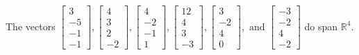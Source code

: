 \begin{exercise}
\begin{exerciseStatement}
  \end{exerciseStatement}
  \begin{exerciseAnswer}
   The vectors \(\left[\begin{array}{r}
3 \\
-5 \\
-1 \\
-1
\end{array}\right] , \left[\begin{array}{r}
4 \\
3 \\
2 \\
-2
\end{array}\right] , \left[\begin{array}{r}
4 \\
-2 \\
-1 \\
1
\end{array}\right] , \left[\begin{array}{r}
12 \\
4 \\
3 \\
-3
\end{array}\right] , \left[\begin{array}{r}
3 \\
-2 \\
4 \\
0
\end{array}\right] , \text{ and } \left[\begin{array}{r}
-3 \\
-2 \\
4 \\
-2
\end{array}\right]\) 
  	 do  
	span \(\mathbb{R}^4\).
  


  \end{exerciseAnswer}
\end{exercise}